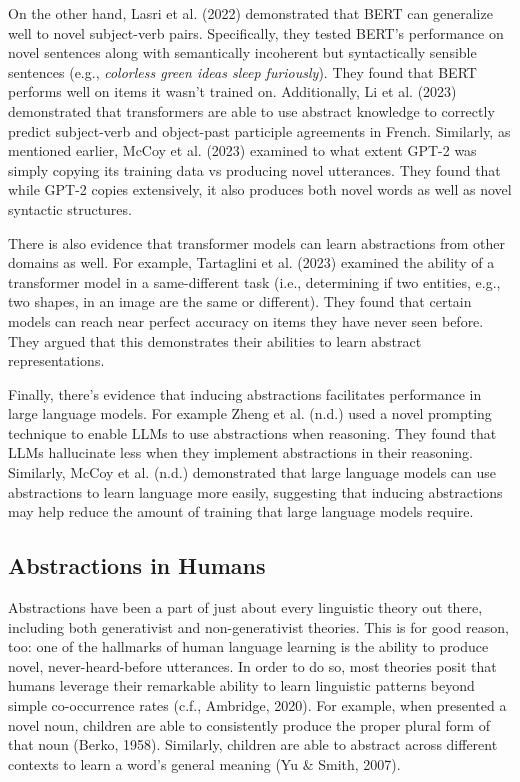 \documentclass[
  10pt,
  nohyperref]{acl}
\begin{document}
On the other hand, Lasri et al. (2022) demonstrated that BERT can
generalize well to novel subject-verb pairs. Specifically, they tested
BERT's performance on novel sentences along with semantically incoherent
but syntactically sensible sentences (e.g., \emph{colorless green ideas
sleep furiously}). They found that BERT performs well on items it wasn't
trained on. Additionally, Li et al. (2023) demonstrated that
transformers are able to use abstract knowledge to correctly predict
subject-verb and object-past participle agreements in French. Similarly,
as mentioned earlier, McCoy et al. (2023) examined to what extent GPT-2
was simply copying its training data vs producing novel utterances. They
found that while GPT-2 copies extensively, it also produces both novel
words as well as novel syntactic structures.

There is also evidence that transformer models can learn abstractions
from other domains as well. For example, Tartaglini et al. (2023)
examined the ability of a transformer model in a same-different task
(i.e., determining if two entities, e.g., two shapes, in an image are
the same or different). They found that certain models can reach near
perfect accuracy on items they have never seen before. They argued that
this demonstrates their abilities to learn abstract representations.

Finally, there's evidence that inducing abstractions facilitates
performance in large language models. For example Zheng et al. (n.d.)
used a novel prompting technique to enable LLMs to use abstractions when
reasoning. They found that LLMs hallucinate less when they implement
abstractions in their reasoning. Similarly, McCoy et al. (n.d.)
demonstrated that large language models can use abstractions to learn
language more easily, suggesting that inducing abstractions may help
reduce the amount of training that large language models require.

\subsection{Abstractions in Humans}\label{abstractions-in-humans}

Abstractions have been a part of just about every linguistic theory out
there, including both generativist and non-generativist theories. This
is for good reason, too: one of the hallmarks of human language learning
is the ability to produce novel, never-heard-before utterances. In order
to do so, most theories posit that humans leverage their remarkable
ability to learn linguistic patterns beyond simple co-occurrence rates
(c.f., Ambridge, 2020). For example, when presented a novel noun,
children are able to consistently produce the proper plural form of that
noun (Berko, 1958). Similarly, children are able to abstract across
different contexts to learn a word's general meaning (Yu \& Smith,
2007).
\end{document}
